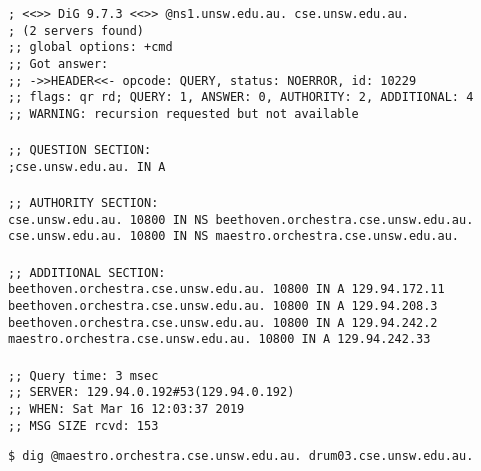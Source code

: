 \documentclass[a4paper,11pt]{article}
\newcommand{\code}{\texttt}
\begin{document}
\begin{enumerate}[leftmargin=*]
	\code{; <<>> DiG 9.7.3 <<>> @ns1.unsw.edu.au. cse.unsw.edu.au.\\
	; (2 servers found)\\
	;; global options: +cmd\\
	;; Got answer:\\
	;; ->>HEADER<<- opcode: QUERY, status: NOERROR, id: 10229\\
	;; flags: qr rd; QUERY: 1, ANSWER: 0, AUTHORITY: 2, ADDITIONAL: 4\\
	;; WARNING: recursion requested but not available\\
	\\
	;; QUESTION SECTION:\\
	;cse.unsw.edu.au.		IN	A\\
	\\
	;; AUTHORITY SECTION:\\
	cse.unsw.edu.au.	10800	IN	NS	beethoven.orchestra.cse.unsw.edu.au.\\
	cse.unsw.edu.au.	10800	IN	NS	maestro.orchestra.cse.unsw.edu.au.\\
	\\
	;; ADDITIONAL SECTION:\\
	beethoven.orchestra.cse.unsw.edu.au. 10800 IN A	129.94.172.11\\
	beethoven.orchestra.cse.unsw.edu.au. 10800 IN A	129.94.208.3\\
	beethoven.orchestra.cse.unsw.edu.au. 10800 IN A	129.94.242.2\\
	maestro.orchestra.cse.unsw.edu.au. 10800 IN A	129.94.242.33\\
	\\
	;; Query time: 3 msec\\
	;; SERVER: 129.94.0.192\#53(129.94.0.192)\\
	;; WHEN: Sat Mar 16 12:03:37 2019\\
	;; MSG SIZE  rcvd: 153\\}

	\code{\$ dig @maestro.orchestra.cse.unsw.edu.au. drum03.cse.unsw.edu.au.}


\end{enumerate}
\end{document}
